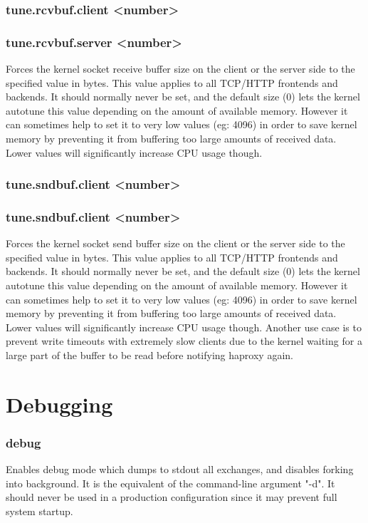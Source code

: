 \subsubsection[tune.rcvbuf.client]{tune.rcvbuf.client <number>}
\subsubsection[tune.rcvbuf.server]{tune.rcvbuf.server <number>}
  Forces the kernel socket receive buffer size on the client or the server side
  to the specified value in bytes. This value applies to all TCP/HTTP frontends
  and backends. It should normally never be set, and the default size (0) lets
  the kernel autotune this value depending on the amount of available memory.
  However it can sometimes help to set it to very low values (eg: 4096) in
  order to save kernel memory by preventing it from buffering too large amounts
  of received data. Lower values will significantly increase CPU usage though.

\subsubsection[tune.sndbuf.client]{tune.sndbuf.client <number>}
\subsubsection[tune.sndbuf.server]{tune.sndbuf.client <number>}
  Forces the kernel socket send buffer size on the client or the server side to
  the specified value in bytes. This value applies to all TCP/HTTP frontends
  and backends. It should normally never be set, and the default size (0) lets
  the kernel autotune this value depending on the amount of available memory.
  However it can sometimes help to set it to very low values (eg: 4096) in
  order to save kernel memory by preventing it from buffering too large amounts
  of received data. Lower values will significantly increase CPU usage though.
  Another use case is to prevent write timeouts with extremely slow clients due
  to the kernel waiting for a large part of the buffer to be read before
  notifying haproxy again.

\section{Debugging}

\subsubsection[debug]{debug}
  Enables debug mode which dumps to stdout all exchanges, and disables forking
  into background. It is the equivalent of the command-line argument "-d". It
  should never be used in a production configuration since it may prevent full
  system startup.

